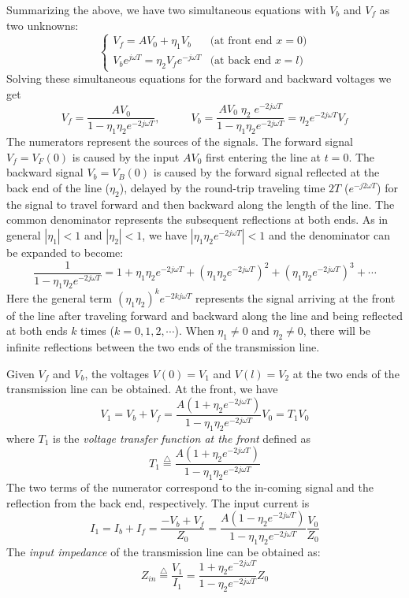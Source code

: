 Summarizing the above, we have two simultaneous equations with 
$V_b$ and $V_f$ as two unknowns:
\[ \left\{ \begin{array}{ll}
V_f=AV_0+\eta_1V_b & \mbox{(at front end $x=0$)} \\
V_be^{j\omega T}=\eta_2V_fe^{-j\omega T} & \mbox{(at back end $x=l$)}
	\end{array} \right. \]
Solving these simultaneous equations for the forward and backward voltages
we get
\[ V_f=\frac{AV_0}{1-\eta_1\eta_2e^{-2j\omega T}},\;\;\;\;\;\;\;\;\;\;
   V_b=\frac{AV_0\;\eta_2\;e^{-2j\omega T}}{1-\eta_1\eta_2e^{-2j\omega T}}
   =\eta_2e^{-2j\omega T} V_f
\]
The numerators represent the sources of the signals. The forward signal 
$V_f=V_F(0)$ is caused by the input $AV_0$ first entering the line at $t=0$.
The backward signal $V_b=V_B(0)$ is caused by the forward signal reflected 
at the back end of the line ($\eta_2$), delayed by the round-trip traveling 
time $2T$ ($e^{-j2\omega T}$) for the signal to travel forward and then backward 
along the length of the line. The common denominator represents the subsequent
reflections at both ends. As in general $|\eta_1|<1$ and $|\eta_2|<1$, we 
have $|\eta_1\eta_2e^{-2j\omega T}|<1$ and the denominator can be expanded to 
become:
\[	\frac{1}{1-\eta_1\eta_2e^{-2j\omega T}}=1+\eta_1\eta_2e^{-2j\omega T}
	+(\eta_1\eta_2e^{-2j\omega T})^2+(\eta_1\eta_2e^{-2j\omega T})^3+\cdots 
\]
Here the general term $(\eta_1\eta_2)^ke^{-2kj\omega T}$ represents the signal 
arriving at the front of the line after traveling forward and backward along 
the line and being reflected at both ends $k$ times ($k=0,1,2,\cdots$). When 
$\eta_1\ne 0$ and  $\eta_2\ne 0$, there will be infinite reflections between
the two ends of the transmission line.

Given $V_f$ and $V_b$, the voltages $V(0)=V_1$ and $V(l)=V_2$ at the two ends 
of the transmission line can be obtained. At the front, we have
\[ V_1=V_b+V_f=\frac{A(1+\eta_2e^{-2j\omega T})}{1-\eta_1\eta_2e^{-2j\omega T}}V_0 = T_1V_0 \]
where $T_1$ is the {\em voltage transfer function at the front} 
defined as
\[ T_1\stackrel{\triangle}{=}\frac{A(1+\eta_2e^{-2j\omega T})}{1-\eta_1\eta_2e^{-2j\omega T}}	\]
The two terms of the numerator correspond to the in-coming signal and the
reflection from the back end, respectively. The input current is
\[  I_1=I_b+I_f=\frac{-V_b+V_f}{Z_0}
=\frac{A(1-\eta_2e^{-2j\omega T})}{1-\eta_1\eta_2e^{-2j\omega T}} \frac{V_0}{Z_0}	\]
The {\em input impedance} of the transmission line can be obtained as:
\[ Z_{in}\stackrel{\triangle}{=}\frac{V_1}{I_1}=\frac{1+\eta_2e^{-2j\omega T}}{1-\eta_2e^{-2j\omega T}}
Z_0 \]

